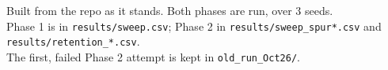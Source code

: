 \documentclass[11pt]{article}
\newcommand{\code}[1]{\texttt{\small #1}}
\begin{document}
\bigskip
\begin{center}
{\color{ink2}\small Built from the repo as it stands. Both phases are run, over
3 seeds.\\ Phase 1 is in \code{results/sweep.csv}; Phase 2 in
\code{results/sweep\_spur*.csv} and \code{results/retention\_*.csv}.\\
The first, failed Phase 2 attempt is kept in \code{old\_run\_Oct26/}.}
\end{center}
\end{document}
